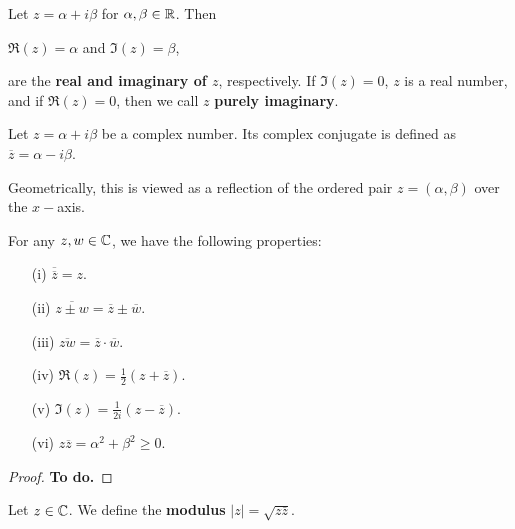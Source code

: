 \documentclass[a4paper]{report}
\begin{document}
\begin{definition}
   Let \( z = \alpha + i \beta  \) for \( \alpha, \beta \in \mathbb{R}  \). Then  
   \begin{center}
       \( \Re(z) = \alpha  \) and \( \Im(z) = \beta   \),
   \end{center}
   are the \textbf{real and imaginary of \( z  \)}, respectively.
   If \( \Im(z) = 0   \), \( z  \) is a real number, and if \( \Re(z) = 0  \), then we call \( z  \) \textbf{purely imaginary}.
\end{definition}

\begin{definition}
    Let \( z = \alpha + i \beta  \) be a complex number. Its complex conjugate is defined as \( \overline{z} = \alpha - i \beta  \).
\end{definition}

Geometrically, this is viewed as a reflection of the ordered pair \( z = (\alpha, \beta)  \) over the \( x- \)axis.

\begin{prop}
    For any \( z,w \in \mathbb{C}  \), we have the following properties:
   \begin{enumerate}
       \item[(i)] \( \overline{\overline{z}} = z  \).
        \item[(ii)] \( \overline{z \pm w} = \overline{z} \pm \overline{w} \). 
        \item[(iii)] \( \overline{zw} = \overline{z} \cdot \overline{w} \).
        \item[(iv)] \( \Re(z) = \frac{ 1 }{ 2 }  ( z + \overline{z}) \).
        \item[(v)] \( \Im(z) = \frac{ 1 }{ 2i } (z - \overline{z}) \). 
        \item[(vi)] \( z \overline{z} = \alpha^{2} + \beta^{2} \geq 0 \).
   \end{enumerate} 
\end{prop}
\begin{proof}
\textbf{To do.}
\end{proof}

\begin{definition}
   Let \( z \in \mathbb{C}  \). We define the \textbf{modulus} \( | z  |  = \sqrt{ z \overline{z} }  \).
\end{definition}
\end{document}
